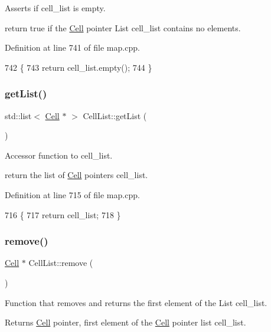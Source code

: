 Asserts if cell\+\_\+list is empty. 

return true if the \hyperlink{class_cell}{Cell} pointer List cell\+\_\+list contains no elements. 

Definition at line 741 of file map.\+cpp.


\begin{DoxyCode}
742 \{
743     \textcolor{keywordflow}{return} cell\_list.empty();
744 \}
\end{DoxyCode}
\hypertarget{class_cell_list_aa5fee7de166143e16a0ec1f20349db55}{}\label{class_cell_list_aa5fee7de166143e16a0ec1f20349db55} 
\subsubsection{\texorpdfstring{get\+List()}{getList()}}
{\footnotesize\ttfamily std\+::list$<$ \hyperlink{class_cell}{Cell} $\ast$ $>$ Cell\+List\+::get\+List (\begin{DoxyParamCaption}{ }\end{DoxyParamCaption})}



Accessor function to cell\+\_\+list. 

return the list of \hyperlink{class_cell}{Cell} pointers cell\+\_\+list. 

Definition at line 715 of file map.\+cpp.


\begin{DoxyCode}
716 \{
717     \textcolor{keywordflow}{return} cell\_list;
718 \}
\end{DoxyCode}
\hypertarget{class_cell_list_abc7337272382af9d9782628666f9e594}{}\label{class_cell_list_abc7337272382af9d9782628666f9e594} 
\subsubsection{\texorpdfstring{remove()}{remove()}}
{\footnotesize\ttfamily \hyperlink{class_cell}{Cell} $\ast$ Cell\+List\+::remove (\begin{DoxyParamCaption}{ }\end{DoxyParamCaption})}



Function that removes and returns the first element of the List cell\+\_\+list. 

\begin{DoxyReturn}{Returns}
\hyperlink{class_cell}{Cell} pointer, first element of the \hyperlink{class_cell}{Cell} pointer list cell\+\_\+list. 
\end{DoxyReturn}


